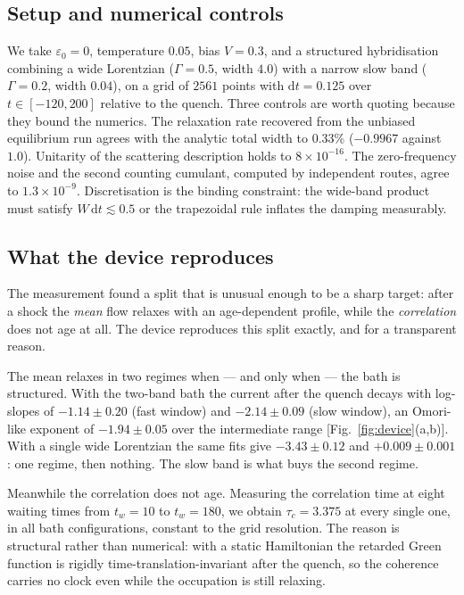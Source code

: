 \documentclass[aps,pre,twocolumn,superscriptaddress,floatfix,nofootinbib]{revtex4-2}
\newcommand{\eps}{\varepsilon}
\newcommand{\dd}{\mathrm{d}}
\begin{document}
\subsection{Setup and numerical controls}

We take $\eps_0=0$, temperature $0.05$, bias $V=0.3$, and a structured
hybridisation combining a wide Lorentzian ($\Gamma=0.5$, width $4.0$) with a
narrow slow band ($\Gamma=0.2$, width $0.04$), on a grid of $2561$ points with
$\dd t=0.125$ over $t\in[-120,200]$ relative to the quench. Three controls are
worth quoting because they bound the numerics. The relaxation rate recovered
from the unbiased equilibrium run agrees with the analytic total width to
$0.33\%$ ($-0.9967$ against $1.0$). Unitarity of the scattering description
holds to $8\times10^{-16}$. The zero-frequency noise and the second counting
cumulant, computed by independent routes, agree to $1.3\times10^{-9}$. Discretisation is the
binding constraint: the wide-band product must satisfy $W\,\dd t\lesssim0.5$ or
the trapezoidal rule inflates the damping measurably.

\subsection{What the device reproduces}

The measurement \cite{paper1} found a split that is unusual enough to be a
sharp target: after a shock the \emph{mean} flow relaxes with an age-dependent
profile, while the \emph{correlation} does not age at all. The device reproduces
this split exactly, and for a transparent reason.

The mean relaxes in two regimes when --- and only when --- the bath is
structured. With the two-band bath the current after the quench decays with
log-slopes of $-1.14\pm0.20$ (fast window) and $-2.14\pm0.09$ (slow window),
an Omori-like exponent of $-1.94\pm0.05$ over the intermediate range
[Fig.~\ref{fig:device}(a,b)]. With a single wide Lorentzian the same fits give
$-3.43\pm0.12$ and $+0.009\pm0.001$: one regime, then nothing. The slow band is
what buys the second regime.

Meanwhile the correlation does not age. Measuring the correlation time at eight
waiting times from $t_w=10$ to $t_w=180$, we obtain $\tau_c=3.375$ at every
single one, in all bath configurations, constant to the grid resolution. The
reason is structural rather than numerical: with a static Hamiltonian the
retarded Green function is rigidly time-translation-invariant after the quench,
so the coherence carries no clock even while the occupation is still relaxing.
\end{document}
